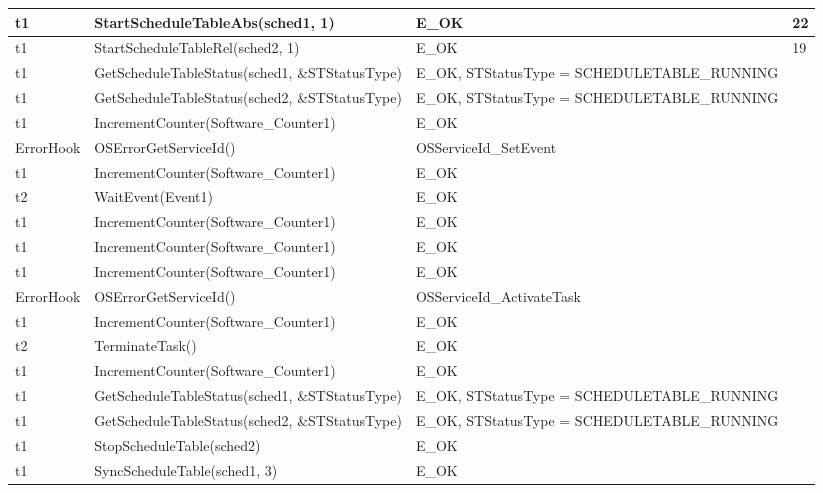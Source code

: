\documentclass[10pt]{article}
\newlength{\Li}\settowidth{\Li}{Running}
\newlength{\Lii}\setlength{\Lii}{7cm}
\newlength{\Liiii}\setlength{\Liiii}{0.9cm}
\newlength{\Liii}\setlength{\Liii}{\textwidth} \addtolength{\Liii}{-\Li} \addtolength{\Liii}{-\Lii} \addtolength{\Liii}{-\Liiii}
\begin{document}
	\begin{supertabular}{|p{\Li}|p{\Lii}|p{\Liii}|p{\Liiii}|} \hline 
	t1		& StartScheduleTableAbs(sched1, 1)									& E\_OK																	& 22\\ \hline
	t1		& StartScheduleTableRel(sched2, 1)									& E\_OK																	& 19 \\ \hline
	t1		& GetScheduleTableStatus(sched1, \&STStatusType)						& E\_OK, STStatusType = SCHEDULETABLE\_RUNNING							& \\ \hline
	t1		& GetScheduleTableStatus(sched2, \&STStatusType)						& E\_OK, STStatusType = SCHEDULETABLE\_RUNNING 							& \\ \hline
	t1		& IncrementCounter(Software\_Counter1)								& E\_OK																	& \\ \hline
	ErrorHook	& OSErrorGetServiceId()												& OSServiceId\_SetEvent														& \\ \hline
	t1		& IncrementCounter(Software\_Counter1)								& E\_OK																	& \\ \hline
	t2		& WaitEvent(Event1)													& E\_OK																	& \\ \hline
	t1		& IncrementCounter(Software\_Counter1)								& E\_OK																	& \\ \hline
	t1		& IncrementCounter(Software\_Counter1)								& E\_OK																	& \\ \hline
	t1		& IncrementCounter(Software\_Counter1)								& E\_OK																	& \\ \hline
	ErrorHook	& OSErrorGetServiceId()												& OSServiceId\_ActivateTask													& \\ \hline
	t1		& IncrementCounter(Software\_Counter1)								& E\_OK																	& \\ \hline
	t2		& TerminateTask()													& E\_OK																	& \\ \hline
	t1		& IncrementCounter(Software\_Counter1)								& E\_OK																	& \\ \hline
	t1		& GetScheduleTableStatus(sched1, \&STStatusType)						& E\_OK, STStatusType = SCHEDULETABLE\_RUNNING							& \\ \hline
	t1		& GetScheduleTableStatus(sched2, \&STStatusType)						& E\_OK, STStatusType = SCHEDULETABLE\_RUNNING							& \\ \hline
	t1		& StopScheduleTable(sched2)											& E\_OK																	& \\ \hline
	t1		& SyncScheduleTable(sched1, 3)										& E\_OK																	& \\ \hline

\end{supertabular}
\end{document}
